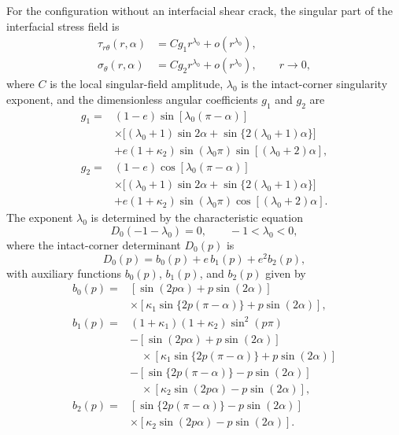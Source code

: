 \documentclass[pdflatex,iicol,sn-mathphys-ay]{sn-jnl}
\begin{document}
\begin{appendices}
For the configuration without an interfacial shear crack, the singular
part of the interfacial stress field is~\citep{NazarenkoKipnis2022Stress}
\begin{equation}
\label{eq:app-intact-field}
\begin{aligned}
  \tau_{r\theta}(r,\alpha)
    &=Cg_1r^{\lambda_0}+o\!\left(r^{\lambda_0}\right),\\
  \sigma_\theta(r,\alpha)
    &=Cg_2r^{\lambda_0}+o\!\left(r^{\lambda_0}\right),
    \qquad r\to0,
\end{aligned}
\end{equation}
where $C$ is the local singular-field amplitude, $\lambda_0$ is
the intact-corner singularity exponent, and the dimensionless angular
coefficients $g_1$ and $g_2$ are
{\small
\begin{equation*}
\begin{aligned}
  g_1={}&(1-e)\sin[\lambda_0(\pi-\alpha)]\\
  &\times\bigl[(\lambda_0+1)\sin2\alpha
       +\sin\{2(\lambda_0+1)\alpha\}\bigr]\\
  &+e(1+\kappa_2)\sin(\lambda_0\pi)
      \sin[(\lambda_0+2)\alpha],\\[2pt]
  g_2={}&(1-e)\cos[\lambda_0(\pi-\alpha)]\\
  &\times\bigl[(\lambda_0+1)\sin2\alpha
       +\sin\{2(\lambda_0+1)\alpha\}\bigr]\\
  &+e(1+\kappa_2)\sin(\lambda_0\pi)
      \cos[(\lambda_0+2)\alpha].
\end{aligned}
\end{equation*}
}
The exponent $\lambda_0$ is determined by the characteristic equation
\begin{equation}
\label{eq:app-D0-root}
  D_0(-1-\lambda_0)=0,
  \qquad -1<\lambda_0<0,
\end{equation}
where the intact-corner determinant $D_0(p)$ is
\begin{equation*}
  D_0(p)=b_0(p)+e\,b_1(p)+e^2b_2(p),
\end{equation*}
with auxiliary functions $b_0(p)$, $b_1(p)$, and $b_2(p)$ given by
{\small
\begin{equation*}
\begin{aligned}
  b_0(p)={}&
  [\sin(2p\alpha)+p\sin(2\alpha)]\\
  &\times[\kappa_1\sin\{2p(\pi-\alpha)\}+p\sin(2\alpha)],\\[2pt]
  b_1(p)={}&(1+\kappa_1)(1+\kappa_2)\sin^2(p\pi)\\
  &-[\sin(2p\alpha)+p\sin(2\alpha)]\\
  &\quad\times[\kappa_1\sin\{2p(\pi-\alpha)\}+p\sin(2\alpha)]\\
  &-[\sin\{2p(\pi-\alpha)\}-p\sin(2\alpha)]\\
  &\quad\times[\kappa_2\sin(2p\alpha)-p\sin(2\alpha)],\\[2pt]
  b_2(p)={}&
  [\sin\{2p(\pi-\alpha)\}-p\sin(2\alpha)]\\
  &\times[\kappa_2\sin(2p\alpha)-p\sin(2\alpha)].
\end{aligned}
\end{equation*}
}

\end{appendices}
\end{document}
